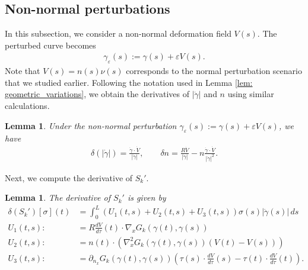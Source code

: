 \documentclass{amsart}
\theoremstyle{plain}
\newtheorem{lemma}[theorem]{Lemma}
\begin{document}
\subsection{Non-normal perturbations}
In this subsection, we consider a non-normal deformation field $V(s)$.
The perturbed curve becomes
\begin{align}
  \gamma_\varepsilon(s):=\gamma(s)+\varepsilon V(s).
\end{align}
Note that $V(s)=n(s)\nu(s)$ corresponds to the normal perturbation scenario that we studied earlier.
Following the notation used in Lemma \ref{lem: geometric_variations}, we obtain the derivatives of $|\dot\gamma|$ and $n$ using similar calculations.
\begin{lemma}\label{lem: geometric_variations2}
  Under the non-normal perturbation $\gamma_\varepsilon(s):=\gamma(s)+\varepsilon V(s)$, we have
    \begin{align}
      \delta(|\dot\gamma|)=\frac{\dot\gamma\cdot\dot V}{|\dot\gamma|},\quad\quad
      \delta n=\frac{R\dot V}{|\dot\gamma|}-n\frac{\dot\gamma\cdot\dot V}{|\dot\gamma|^2}.
    \end{align}
\end{lemma}
Next, we compute the derivative of $S_k'$.
\begin{lemma}
  The derivative of $S_k'$ is given by
  \begin{equation}
    \begin{aligned}
      \delta(S_k')[\sigma](t) &= \int_0^L (U_1(t,s)+U_2(t,s)+U_3(t,s))\sigma(s)|\dot\gamma(s)|
      \,ds\\
      U_1(t,s):&=R\frac{dV}{d\tau}(t)\cdot\nabla_xG_k(\gamma(t),\gamma(s))\\
      U_2(t,s):&=n(t)\cdot\left(\nabla_x^2G_k(\gamma(t),\gamma(s))(V(t)-V(s))\right)\\
      U_3(t,s):&=\partial_{n_x}G_k(\gamma(t),\gamma(s))\left(\tau(s)\cdot\frac{dV}{d\tau}(s)-\tau(t)\cdot\frac{dV}{d\tau}(t)\right).
    \end{aligned}
  \end{equation}
    
\end{lemma}
\end{document}

